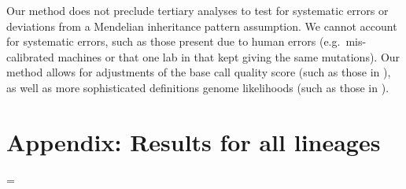 \documentclass[
]{article}
\begin{document}
Our method does not preclude tertiary analyses to test for systematic
errors or deviations from a Mendelian inheritance pattern assumption. We
cannot account for systematic errors, such as those present due to human
errors (e.g.~mis-calibrated machines or that one lab in \citet{blank}
that kept giving the same mutations). Our method allows for adjustments
of the base call quality score (such as those in \citet{blank}), as well
as more sophisticated definitions genome likelihoods (such as those in
\citet{blank2}).

\hypertarget{appendix-results-for-all-lineages}{%
\section{Appendix: Results for all
lineages}\label{appendix-results-for-all-lineages}}

\LTcapwidth=\textwidth
\end{document}
